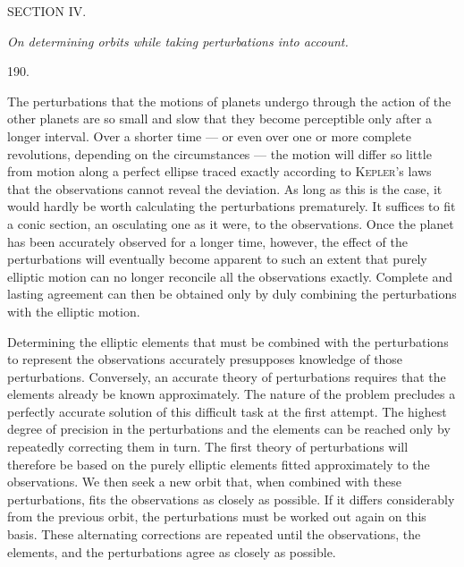 \clearpage
{}
\begin{center}
{\large SECTION IV.}\par\medskip
{}
\textit{On determining orbits while taking perturbations into account.}
\end{center}
\begin{center}\hypertarget{native-264-article190}{}190.\end{center}
The perturbations that the motions of planets undergo through the action of
the other planets are so small and slow that they become perceptible only
after a longer interval. Over a shorter time --- or even over one or more
complete revolutions, depending on the circumstances --- the motion will
differ so little from motion along a perfect ellipse traced exactly according
to \textsc{Kepler}'s laws that the observations cannot reveal the deviation.
As long as this is the case, it would hardly be worth calculating the
perturbations prematurely. It suffices to fit a conic section, an osculating
one as it were, to the observations. Once the planet has been accurately
observed for a longer time, however, the effect of the perturbations will
eventually become apparent to such an extent that purely elliptic motion
can no longer reconcile all the observations exactly. Complete and lasting
agreement can then be obtained only by duly combining the perturbations
with the elliptic motion.

Determining the elliptic elements that must be combined with the perturbations
to represent the observations accurately presupposes knowledge of those
perturbations. Conversely, an accurate theory of perturbations requires
that the elements already be known approximately. The nature of the problem
precludes a perfectly accurate solution of this difficult task at the first
attempt. The highest degree of precision in the perturbations and the elements
can be reached only by repeatedly correcting them in turn. The first theory
of perturbations will therefore be based on the purely elliptic
elements fitted approximately to the observations. We then
seek a new orbit that, when combined with these perturbations, fits the
observations as closely as possible. If it differs considerably from the
previous orbit, the perturbations must be worked out again on this basis.
These alternating corrections are repeated until the observations, the
elements, and the perturbations agree as closely as possible.
